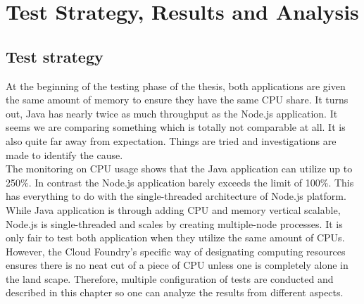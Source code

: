 \chapter{Test Strategy, Results and Analysis}
\section{Test strategy}
At the beginning of the testing phase of the thesis, both applications are given the same amount of memory to ensure they have the same CPU share. It turns out, Java has nearly twice as much throughput as the Node.js application. It seems we are comparing something which is totally not comparable at all. It is also quite far away from expectation. Things are tried and investigations are made to identify the cause. \\
The monitoring on CPU usage shows that the Java application can utilize up to 250\%. In contrast the Node.js application barely exceeds the limit of 100\%. This has everything to do with the single-threaded architecture of Node.js platform. While Java application is through adding CPU and memory vertical scalable, Node.js is single-threaded and scales by creating multiple-node processes. It is only fair to test both application when they utilize the same amount of CPUs. However, the Cloud Foundry's specific way of designating computing resources ensures there is no neat cut of a piece of CPU unless one is completely alone in the land scape. Therefore, multiple configuration of tests are conducted and described in this chapter so one can analyze the results from different aspects.  \\

